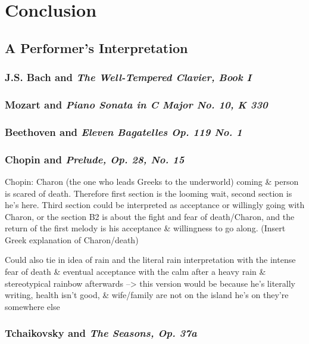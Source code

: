 \chapter*{Conclusion}\label{conclusion}

\section*{A Performer's Interpretation}

\subsection*{J.S. Bach and \textit{The Well-Tempered Clavier, Book I}}

\subsection*{Mozart and \textit{Piano Sonata in C Major No. 10, K 330}}

\subsection*{Beethoven and \textit{Eleven Bagatelles Op. 119 No. 1}}

\subsection*{Chopin and \textit{Prelude, Op. 28, No. 15}}\label{subsection:chopin-intepretation}

Chopin: Charon (the one who leads Greeks to the underworld) coming \& person is scared of death. Therefore first section is the looming wait, second section is he’s here. Third section could be interpreted as acceptance or willingly going with Charon, or the section B2 is about the fight and fear of death/Charon, and the return of the first melody is his acceptance & willingness to go along. (Insert Greek explanation of Charon/death)

Could also tie in idea of rain and the literal rain interpretation with the intense fear of death \& eventual acceptance with the calm after a heavy rain \& stereotypical rainbow afterwards --> this version would be because he's literally writing, health isn't good, \& wife/family are not on the island he's on they're somewhere else

\subsection*{Tchaikovsky and \textit{The Seasons, Op. 37a}}

